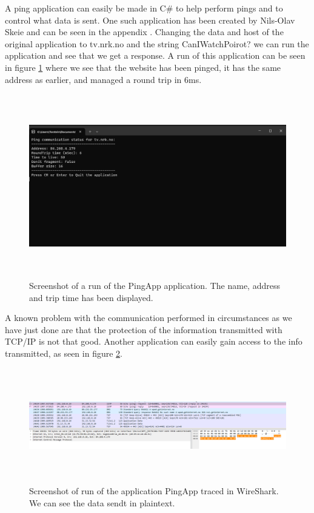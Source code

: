 \documentclass[11pt, A4paper, english]{article}
\begin{document}
A ping application can easily be made in C\# to help perform pings and to control what data is sent. One such application has been created by Nils-Olav Skeie and can be seen in the appendix \cite{Assignment}. Changing the data and host of the original application to tv.nrk.no and the string CanIWatchPoirot? we can run the application and see that we get a response. A run of this application can be seen in figure \ref{im:app_test} where we see that the website has been pinged, it has the same address as earlier, and managed a round trip in 6ms.
				\begin{figure}
\includegraphics[width=12.6cm, height=8cm]{app_test.png}
\caption{Screenshot of a run of the PingApp application. The name, address and trip time has been displayed.}
\label{im:app_test}	
				\end{figure}
A known problem with the communication performed in circumstances as we have just done are that the protection of the information transmitted with TCP/IP is not that good. Another application can easily gain access to the info transmitted, as seen in figure \ref{im:app_test_WS}.
				\begin{figure}
\includegraphics[width=12.6cm, height=5cm]{plaintext.png}
\caption{Screenshot of run of the application PingApp traced in WireShark. We can see the data sendt in plaintext.}
\label{im:app_test_WS}
				\end{figure}
\end{document}
